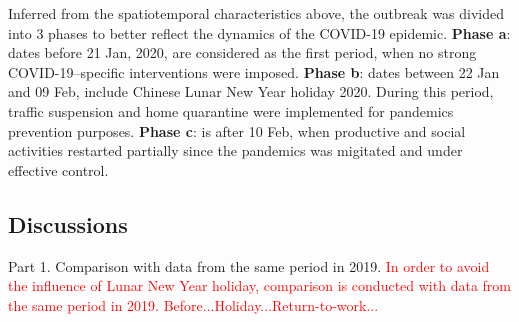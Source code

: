 \documentclass[preprints,ijgi,submit,moreauthors]{Definitions/mdpi}
\begin{document}
Inferred from the spatiotemporal characteristics above, the outbreak was divided into 3 phases to better reflect the dynamics of the COVID-19 epidemic.
\textbf{Phase a}: dates before 21 Jan, 2020, are considered as the first period, when no strong COVID-19–specific interventions were imposed.
\textbf{Phase b}: dates between 22 Jan and 09 Feb, include Chinese Lunar New Year holiday 2020. During this period, traffic suspension and home quarantine were implemented for pandemics prevention purposes.
\textbf{Phase c}: is after 10 Feb, when productive and social activities restarted partially since the pandemics was migitated and under effective control.

\subsection{Discussions}
Part 1. Comparison with data from the same period in 2019.
\textcolor{red}{In order to avoid the influence of Lunar New Year holiday, comparison is conducted with data from the same period in 2019. Before...Holiday...Return-to-work...}
\end{document}

